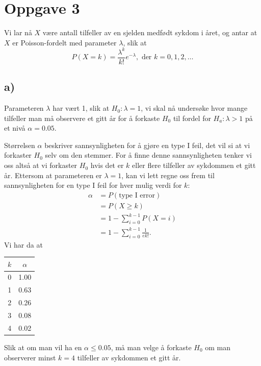 \documentclass[a4paper, 11pt, titlepage, english]{article}
\begin{document}
\clearpage

\section*{Oppgave 3}

Vi lar nå $X$ være antall tilfeller av en sjelden medfødt sykdom i året, og antar at $X$ er Poisson-fordelt med parameter $\lambda$, slik at
$$P(X = k) = \frac{\lambda^k}{k!}e^{-\lambda}, \mbox{ der } k=0,1,2,\ldots$$

\subsection*{a)}
Parameteren $\lambda$ har vært 1, slik at $H_0:\lambda = 1$, vi skal nå undersøke hvor mange tilfeller man må observere et gitt år for å forkaste $H_0$ til fordel for $H_a: \lambda > 1$ på et nivå $\alpha = 0.05$.

Størrelsen $\alpha$ beskriver sannsynligheten for å gjøre en type I feil, det vil si at vi forkaster $H_0$ selv om den stemmer. For å finne denne sannsynligheten tenker vi oss altså at vi forkaster $H_0$ hvis det er $k$ eller flere tilfeller av sykdommen et gitt år. Ettersom at parameteren er $\lambda = 1$, kan vi lett regne oss frem til sannsynligheten for en type I feil for hver mulig verdi for $k$:
\begin{align*}
\alpha &= P(\mbox{type I error}) \\
&= P(X\geq k) \\
&= 1 - \sum_{i=0}^{k-1} P(X=i) \\
&= 1 - \sum_{i=0}^{k-1} \frac{1}{ek!}.
\end{align*}
Vi har da at
\begin{center}
\begin{tabular}{c|c}
$k$ & $\alpha$ \\
\hline
0 & 1.00 \\
1 & 0.63 \\
2 & 0.26 \\
3 & 0.08 \\
4 & 0.02 
\end{tabular}
\end{center}
Slik at om man vil ha en $\alpha \leq 0.05$, må man velge å forkaste $H_0$ om man observerer minst $k=4$ tilfeller av sykdommen et gitt år.

\clearpage
\end{document}
